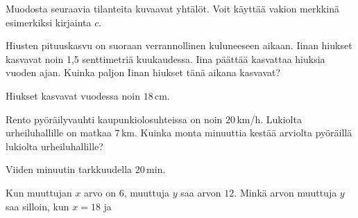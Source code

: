 \begin{tehtavasivu}
\begin{tehtava}
Muodosta seuraavia tilanteita kuvaavat yhtälöt. Voit käyttää vakion merkkinä esimerkiksi kirjainta $c$. %
\begin{alakohdat}
\end{alakohdat}
\begin{vastaus}
\begin{alakohdat}
\end{alakohdat}
\end{vastaus}
\end{tehtava}

\begin{tehtava}
Hiusten pituuskasvu on suoraan verrannollinen kuluneeseen aikaan. Iinan hiukset kasvavat noin 1,5 senttimetriä kuukaudessa. Iina päättää kasvattaa hiuksia vuoden ajan. Kuinka paljon Iinan hiukset tänä aikana kasvavat?
\begin{vastaus}
Hiukset kasvavat vuodessa noin $18$\,cm.
\end{vastaus}
\end{tehtava}

\begin{tehtava}
Rento pyöräilyvauhti kaupunkiolosuhteissa on noin $20$\,km/h. Lukiolta urheiluhallille on matkaa $7$\,km. Kuinka monta minuuttia kestää arviolta pyöräillä lukiolta urheiluhallille?
\begin{vastaus}
Viiden minuutin tarkkuudella $20$\,min.
\end{vastaus}
\end{tehtava}

\begin{tehtava}
Kun muuttujan $x$ arvo on $6$, muuttuja $y$ saa arvon $12$. Minkä arvon muuttuja $y$ saa silloin, kun $x=18$ ja
	\begin{alakohdat}
\end{alakohdat} 
	\begin{vastaus}
		\begin{alakohdat}
\end{alakohdat} 
	\end{vastaus}
\end{tehtava}


\end{tehtavasivu}
